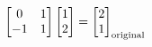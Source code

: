 \documentclass[preview]{standalone}
\begin{document}
\begin{align*}
\begin{bmatrix}0&1\\-1&1\end{bmatrix} \begin{bmatrix}1\\2\end{bmatrix} = \begin{bmatrix}2\\1\end{bmatrix}_{\rm original}
\end{align*}
\end{document}
